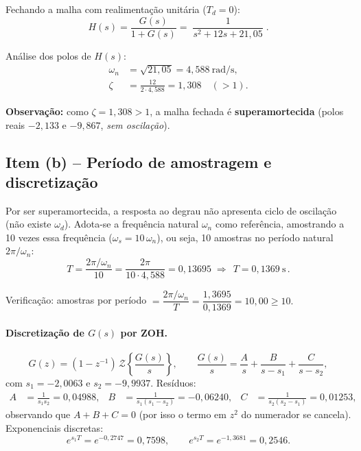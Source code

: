 \documentclass[11pt,a4paper]{article}
\begin{document}
Fechando a malha com realimenta\c{c}\~ao unit\'aria ($T_d=0$):
\begin{equation}
H(s)=\frac{G(s)}{1+G(s)}=\boxed{\;\dfrac{1}{s^2+12s+21{,}05}\;}.
\end{equation}

An\'alise dos polos de $H(s)$:
\begin{align}
\omega_n &= \sqrt{21{,}05}=4{,}588~\mathrm{rad/s}, \\
\zeta    &= \frac{12}{2\cdot 4{,}588}=1{,}308 \quad (>1).
\end{align}

\noindent\textbf{Observa\c{c}\~ao:} como $\zeta = 1{,}308 > 1$, a malha fechada \'e
\textbf{superamortecida} (polos reais $-2{,}133$ e $-9{,}867$, \emph{sem oscila\c{c}\~ao}).

\subsection{Item (b) -- Per\'iodo de amostragem e discretiza\c{c}\~ao}

Por ser superamortecida, a resposta ao degrau n\~ao apresenta ciclo de oscila\c{c}\~ao
(n\~ao existe $\omega_d$). Adota-se a frequ\^encia natural $\omega_n$ como refer\^encia,
amostrando a 10 vezes essa frequ\^encia ($\omega_s = 10\,\omega_n$), ou seja, 10 amostras
no per\'iodo natural $2\pi/\omega_n$:
\begin{equation}
T=\frac{2\pi/\omega_n}{10}=\frac{2\pi}{10\cdot 4{,}588}=0{,}13695
\;\Rightarrow\; \boxed{\,T = 0{,}1369~\mathrm{s}\,}.
\end{equation}

\noindent Verifica\c{c}\~ao: amostras por per\'iodo $=\dfrac{2\pi/\omega_n}{T}
=\dfrac{1{,}3695}{0{,}1369}=10{,}00 \ge 10.$

\paragraph{Discretiza\c{c}\~ao de $G(s)$ por ZOH.}
\begin{equation}
G(z)=(1-z^{-1})\,\mathcal{Z}\!\left\{\frac{G(s)}{s}\right\},
\qquad
\frac{G(s)}{s}=\frac{A}{s}+\frac{B}{s-s_1}+\frac{C}{s-s_2},
\end{equation}
com $s_1=-2{,}0063$ e $s_2=-9{,}9937$. Res\'iduos:
\begin{align}
A &= \frac{1}{s_1 s_2} = 0{,}04988, &
B &= \frac{1}{s_1(s_1-s_2)} = -0{,}06240, &
C &= \frac{1}{s_2(s_2-s_1)} = 0{,}01253,
\end{align}
observando que $A+B+C=0$ (por isso o termo em $z^2$ do numerador se cancela).
Exponenciais discretas:
\begin{equation}
e^{s_1 T}=e^{-0{,}2747}=0{,}7598,
\qquad
e^{s_2 T}=e^{-1{,}3681}=0{,}2546 .
\end{equation}
\end{document}
